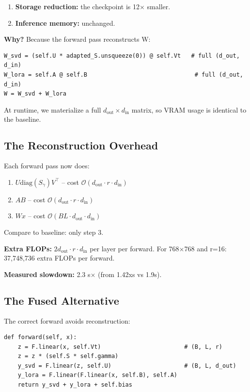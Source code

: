 \begin{enumerate}
\item \textbf{Storage reduction:} the checkpoint is 12$\times$ smaller.
\item \textbf{Inference memory:} unchanged.

\end{enumerate}
\textbf{Why?} Because the forward pass reconstructs W:

\begin{lstlisting}
W_svd = (self.U * adapted_S.unsqueeze(0)) @ self.Vt   # full (d_out, d_in)
W_lora = self.A @ self.B                               # full (d_out, d_in)
W = W_svd + W_lora
\end{lstlisting}

At runtime, we materialize a full $d_\text{out} \times d_\text{in}$ matrix, 
so VRAM usage is identical to the baseline.

\subsection{The Reconstruction Overhead}

Each forward pass now does:

\begin{enumerate}
\item $U \text{diag}(S_\gamma) V^\top$ -- cost $\mathcal{O}(d_\text{out} \cdot r \cdot d_\text{in})$
\item $A B$ -- cost $\mathcal{O}(d_\text{out} \cdot r \cdot d_\text{in})$
\item $W x$ -- cost $\mathcal{O}(BL \cdot d_\text{out} \cdot d_\text{in})$

\end{enumerate}
Compare to baseline: only step 3.

\textbf{Extra FLOPs:} $2 d_\text{out} \cdot r \cdot d_\text{in}$ per layer per 
forward. For 768$\times$768 and r=16: 37,748,736 extra FLOPs per forward.

\textbf{Measured slowdown:} 2.3 s$\times$ (from 1.42xs vs 1.9s).

\subsection{The Fused Alternative}

The correct forward avoids reconstruction:

\begin{lstlisting}
def forward(self, x):
    z = F.linear(x, self.Vt)                        # (B, L, r)
    z = z * (self.S * self.gamma)
    y_svd = F.linear(z, self.U)                     # (B, L, d_out)
    y_lora = F.linear(F.linear(x, self.B), self.A)
    return y_svd + y_lora + self.bias
\end{lstlisting}

